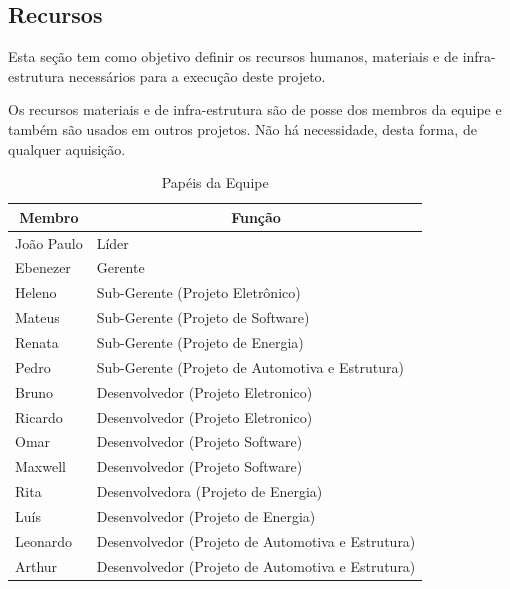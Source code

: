 \subsection{Recursos}

Esta seção tem como objetivo definir os recursos humanos, materiais e de infra-estrutura necessários para a execução deste projeto.

Os recursos materiais e de infra-estrutura são de posse dos membros da equipe e também são usados em outros projetos. Não há necessidade, desta forma, de qualquer aquisição. 

\begin{table}[h!]
\centering
\caption{Papéis da Equipe}
\label{papeisDaEquipe}
\begin{tabular}{|l|l|}
\hline
\multicolumn{1}{|c|}{\textbf{Membro}} & \multicolumn{1}{c|}{\textbf{Função}}              \\ \hline
João Paulo                            & Líder                                             \\ \hline
Ebenezer                              & Gerente                                           \\ \hline
Heleno                                & Sub-Gerente (Projeto Eletrônico)                  \\ \hline
Mateus                                & Sub-Gerente (Projeto de Software)                 \\ \hline
Renata                                & Sub-Gerente (Projeto de Energia)                  \\ \hline
Pedro                                 & Sub-Gerente (Projeto de Automotiva e Estrutura)   \\ \hline
Bruno                                 & Desenvolvedor (Projeto Eletronico)                \\ \hline
Ricardo                               & Desenvolvedor (Projeto Eletronico)                \\ \hline
Omar                                  & Desenvolvedor (Projeto Software)                  \\ \hline
Maxwell                               & Desenvolvedor (Projeto Software)                  \\ \hline
Rita                                  & Desenvolvedora (Projeto de Energia)               \\ \hline
Luís                                  & Desenvolvedor (Projeto de Energia)                \\ \hline
Leonardo                              & Desenvolvedor (Projeto de Automotiva e Estrutura) \\ \hline
Arthur                                & Desenvolvedor (Projeto de Automotiva e Estrutura) \\ \hline
\end{tabular}
\end{table}

